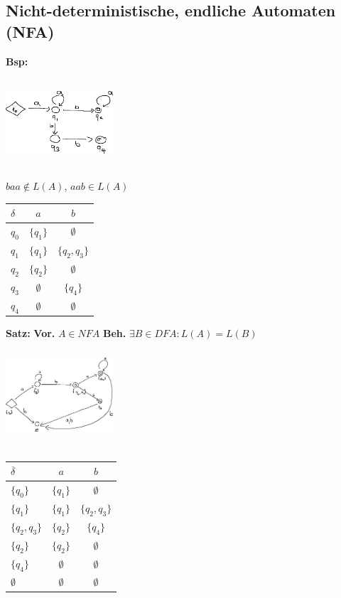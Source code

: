 \documentclass[a4paper,10pt,landscape,twocolumn]{article}
\newcommand{\Bold}[1]{\textbf{#1}} %
\begin{document}
\subsection{Nicht-deterministische, endliche Automaten (NFA)}
\Bold{Bsp:}\\
\includegraphics[width=0.3\textwidth,height=4cm,keepaspectratio]{Bild5.eps}\\
$baa\notin L(A)$, $aab\in L(A)$\\
\begin{tabular}{l|c|c}
 $\delta$&$a$&$b$\\\hline
 $q_0$&$\{q_1\}$&$\emptyset$\\
 $q_1$&$\{q_1\}$&$\{q_2,q_3\}$\\
 $q_2$&$\{q_2\}$&$\emptyset$\\
 $q_3$&$\emptyset$&$\{q_4\}$\\
 $q_4$&$\emptyset$&$\emptyset$
\end{tabular}
\Bold{Satz:} \Bold{Vor.} $A\in NFA$ \Bold{Beh.} $\exists B\in DFA:L(A)=L(B)$\\
\includegraphics[width=0.3\textwidth,height=4cm,keepaspectratio]{Bild6.eps}\\
\begin{tabular}{l|c|c}
 $\overline{\delta}$&$a$&$b$\\\hline
 $\{q_0\}$&$\{q_1\}$&$\emptyset$\\
 $\{q_1\}$&$\{q_1\}$&$\{q_2,q_3\}$\\
 $\{q_2,q_3\}$&$\{q_2\}$&$\{q_4\}$\\
 $\{q_2\}$&$\{q_2\}$&$\emptyset$\\
 $\{q_4\}$&$\emptyset$&$\emptyset$\\
 $\emptyset$&$\emptyset$&$\emptyset$\\
\end{tabular}\\
\end{document}
